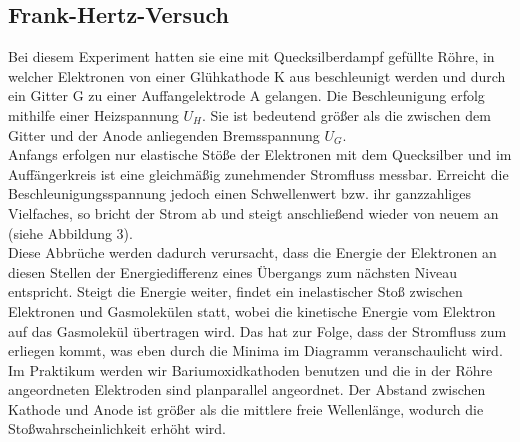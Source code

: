 \documentclass{article}
\begin{document}
{{\subsection{Frank-Hertz-Versuch}
{\begin{center}
\begin{minipage}{\linewidth}
\centering
{}
%
\label{skizze}
\end{minipage}
\end{center}
Bei diesem Experiment hatten sie eine mit Quecksilberdampf gefüllte Röhre, in welcher Elektronen von einer Glühkathode K aus beschleunigt werden und durch ein Gitter G zu einer Auffangelektrode A gelangen. Die Beschleunigung erfolg mithilfe einer Heizspannung \(U_H\). Sie ist bedeutend größer als die zwischen dem Gitter und der Anode anliegenden Bremsspannung \(U_G\).\\
Anfangs erfolgen nur elastische Stöße der Elektronen mit dem Quecksilber und im Auffängerkreis ist eine gleichmäßig zunehmender Stromfluss messbar. Erreicht die Beschleunigungsspannung jedoch einen Schwellenwert bzw. ihr ganzzahliges Vielfaches, so bricht der Strom ab und steigt anschließend wieder von neuem an (siehe Abbildung 3).\\
Diese Abbrüche werden dadurch verursacht, dass die Energie der Elektronen an diesen Stellen der Energiedifferenz eines Übergangs zum nächsten Niveau entspricht. Steigt die Energie weiter, findet ein inelastischer Stoß zwischen Elektronen und Gasmolekülen statt, wobei die kinetische Energie vom Elektron auf das Gasmolekül übertragen wird. Das hat zur Folge, dass der Stromfluss zum erliegen kommt, was eben durch die Minima im Diagramm veranschaulicht wird.\\
Im Praktikum werden wir Bariumoxidkathoden benutzen und die in der Röhre angeordneten Elektroden sind planparallel angeordnet. Der Abstand zwischen Kathode und Anode ist größer als die mittlere freie Wellenlänge, wodurch die Stoßwahrscheinlichkeit erhöht wird.

{\begin{center}
\begin{minipage}{\linewidth}
\centering
{}
%
\label{verlauf}
\end{minipage}
\end{center}

}}}}
\end{document}
